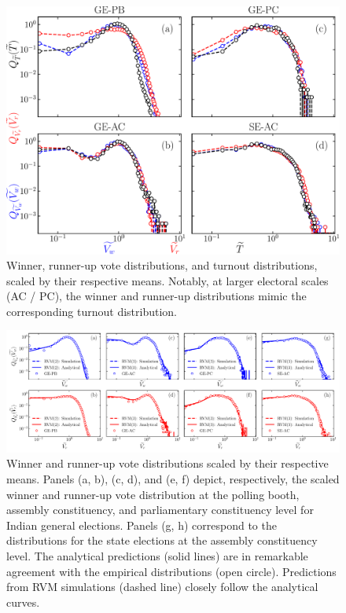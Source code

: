 \documentclass[reprint, pre, twocolumn, aps, showpacs, superscriptaddress]{revtex4-2}
\begin{document}
\begin{figure}[t]
    \centering
    \includegraphics[width=\columnwidth]{fig_1.pdf}
    \caption{Winner, runner-up vote distributions, and turnout distributions, scaled by their respective means. Notably, at larger electoral scales (AC / PC), the winner and runner-up distributions mimic the corresponding turnout distribution.}
    \label{fig:1}
\end{figure}

\begin{figure}[t]
    \centering
    \includegraphics[width=\linewidth]{fig_2.pdf}
    \caption{Winner and runner-up vote distributions scaled by their respective means. Panels (a, b), (c, d), and (e, f) depict, respectively, the scaled winner and runner-up vote distribution at the polling booth, assembly constituency, and parliamentary constituency level for Indian general elections. Panels (g, h) correspond to the distributions for the state elections at the assembly constituency level. The analytical predictions (solid lines) are in remarkable agreement with the empirical distributions (open circle). Predictions from RVM simulations (dashed line) closely follow the analytical curves.}
    \label{fig:2}
\end{figure}
\end{document}
